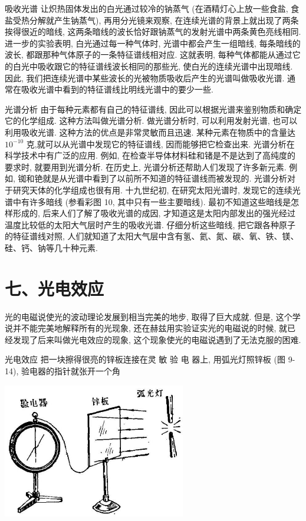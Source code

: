 \documentclass[10pt]{article}
\begin{document}
吸收光谱 让炽热固体发出的白光通过较冷的钠蒸气 (在酒精灯心上放一些食盐, 食盐受热分解就产生钠蒸气), 再用分光镜来观察, 在连续光谱的背景上就出现了两条挨得很近的暗线, 这两条暗线的波长恰好跟钠蒸气的发射光谱中两条黄色亮线相同. 进一步的实验表明, 白光通过每一种气体时, 光谱中都会产生一组暗线, 每条暗线的波长, 都跟那种气体原子的一条特征谱线相对应. 这就表明, 每种气体都能从通过它的白光中吸收跟它的特征谱线波长相同的那些光, 使白光的连续光谱中出现暗线. 因此, 我们把连续光谱中某些波长的光被物质吸收后产生的光谱叫做吸收光谱. 通常在吸收光谱中看到的特征谱线比明线光谱中的要少一些.

光谱分析 由于每种元素都有自己的特征谱线, 因此可以根据光谱来鉴别物质和确定它的化学组成. 这种方法叫做光谱分析. 做光谱分析时, 可以利用发射光谱, 也可以利用吸收光谱. 这种方法的优点是非常灵敏而且迅速. 某种元素在物质中的含量达 \({10}^{-{10}}\) 克,就可以从光谱中发现它的特征谱线, 因而能够把它检查出来. 光谱分析在科学技术中有广泛的应用. 例如, 在检查半导体材料硅和锗是不是达到了高纯度的要求时, 就要用到光谱分析. 在历史上, 光谱分析还帮助人们发现了许多新元素. 例如, 铷和铯就是从光谱中看到了以前所不知道的特征谱线而被发现的. 光谱分析对于研究天体的化学组成也很有用. 十九世纪初, 在研究太阳光谱时, 发现它的连续光谱中有许多暗线 (参看彩图 10, 其中只有一些主要暗线). 最初不知道这些暗线是怎样形成的, 后来人们了解了吸收光谱的成因, 才知道这是太阳内部发出的强光经过温度比较低的太阳大气层时产生的吸收光谱. 仔细分析这些暗线, 把它跟各种原子的特征谱线对照, 人们就知道了太阳大气层中含有氢、氦、氮、碳、氧、铁、镁、硅、钙、钠等几十种元素.

\section*{七、光电效应}

光的电磁说使光的波动理论发展到相当完美的地步, 取得了巨大成就. 但是, 这个学说并不能完美地解释所有的光现象, 还在赫兹用实验证实光的电磁说的时候, 就已经发现了后来叫做光电效应的现象, 这个现象使光的电磁说遇到了无法克服的困难.

光电效应 把一块擦得很亮的锌板连接在灵 敏 验 电 器上, 用弧光灯照锌板 (图 9-14), 验电器的指针就张开一个角

\begin{center}
\includegraphics[max width=0.6\textwidth]{images/01913056-1f15-74d8-9184-9aab52c9d66b_316_629452.jpg}
\end{center}
\end{document}

